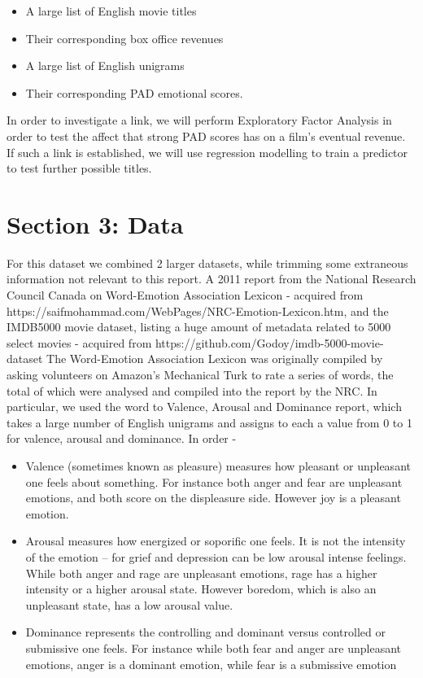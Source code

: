 \documentclass[10pt,a4paper]{article}
\begin{document}
    \begin{itemize}
    \item A large list of English movie titles
    \item Their corresponding box office revenues
    \item A large list of English unigrams
    \item Their corresponding PAD emotional scores.
    \end{itemize}


In order to investigate a link, we will perform Exploratory Factor Analysis in order to test the affect that strong PAD scores has on a film's eventual revenue. If such a link is established, we will use regression modelling to train a predictor to test further possible titles.

    \section{Section 3: Data}

    For this dataset we combined 2 larger datasets, while trimming some extraneous information not relevant to this report. A 2011 report from the National Research Council Canada on Word-Emotion Association Lexicon - acquired from https://saifmohammad.com/WebPages/NRC-Emotion-Lexicon.htm, and the IMDB5000 movie dataset, listing a huge amount of metadata related to 5000 select movies - acquired from https://github.com/Godoy/imdb-5000-movie-dataset
    \newline \newline
    The Word-Emotion Association Lexicon was originally compiled by asking volunteers on Amazon's Mechanical Turk to rate a series of words, the total of which were analysed and compiled into the report by the NRC. In particular, we used the word to Valence, Arousal and Dominance report, which takes a large number of English unigrams and assigns to each a value from 0 to 1 for valence, arousal and dominance. In order -

    \begin{itemize}
        \item Valence (sometimes known as pleasure) measures how pleasant or unpleasant one feels about something. For instance both anger and fear are unpleasant emotions, and both score on the displeasure side. However joy is a pleasant emotion.
        \item Arousal measures how energized or soporific one feels. It is not the intensity of the emotion -- for grief and depression can be low arousal intense feelings. While both anger and rage are unpleasant emotions, rage has a higher intensity or a higher arousal state. However boredom, which is also an unpleasant state, has a low arousal value.
        \item Dominance represents the controlling and dominant versus controlled or submissive one feels. For instance while both fear and anger are unpleasant emotions, anger is a dominant emotion, while fear is a submissive emotion
    \end{itemize}
\end{document}
